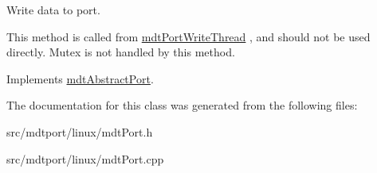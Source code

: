 Write data to port. 

This method is called from \hyperlink{classmdt_port_write_thread}{mdtPortWriteThread} , and should not be used directly. Mutex is not handled by this method. 

Implements \hyperlink{classmdt_abstract_port_a64d4802975a76474b9196c91f57a6d90}{mdtAbstractPort}.



The documentation for this class was generated from the following files:\begin{DoxyCompactItemize}
\item 
src/mdtport/linux/mdtPort.h\item 
src/mdtport/linux/mdtPort.cpp\end{DoxyCompactItemize}
